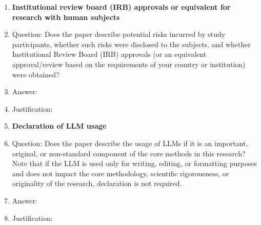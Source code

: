 \documentclass{article}
\begin{document}
\begin{enumerate}
\item {\bf Institutional review board (IRB) approvals or equivalent for research with human subjects}
    \item[] Question: Does the paper describe potential risks incurred by study participants, whether such risks were disclosed to the subjects, and whether Institutional Review Board (IRB) approvals (or an equivalent approval/review based on the requirements of your country or institution) were obtained?
    \item[] Answer: \answerTODO{} %
    \item[] Justification: \justificationTODO{}

\item {\bf Declaration of LLM usage}
    \item[] Question: Does the paper describe the usage of LLMs if it is an important, original, or non-standard component of the core methods in this research? Note that if the LLM is used only for writing, editing, or formatting purposes and does not impact the core methodology, scientific rigorousness, or originality of the research, declaration is not required.
    \item[] Answer: \answerTODO{} %
    \item[] Justification: \justificationTODO{}

\end{enumerate}
\end{document}
